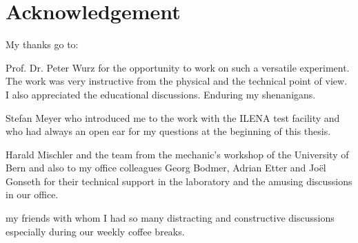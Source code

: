 \documentclass[a4paper, 12pt, abstracton]{scrartcl}
\begin{document}

	
	\newpage
	\thispagestyle{empty}
	\null
	\newpage
	
	\newpage
	
	\clearpage
	\newpage
	\thispagestyle{empty}
	\null
	\newpage
	\clearpage
	
	\newpage
	\thispagestyle{empty}
	\null
	\newpage
	
	\clearpage
	
	\clearpage
	
	\clearpage
	
	\section*{Acknowledgement} %
	
	My thanks go to:
	
	Prof. Dr. Peter Wurz for the opportunity to work on such a versatile experiment. The work was very instructive from the physical and the technical point of view. I also appreciated the educational discussions.
	Enduring my shenanigans.
	
	Stefan Meyer who introduced me to the work with the ILENA test facility and who had always an open ear for my questions at the beginning of this thesis.
		
	Harald Mischler and the team from the mechanic's workshop of the University of Bern and also to my office colleagues Georg Bodmer, Adrian Etter and Joël Gonseth for their technical support in the laboratory and the amusing discussions in our office.
	
	my friends with whom I had so many distracting and constructive discussions especially during our weekly coffee breaks.
	
	\newpage
	\thispagestyle{empty}
	\null
	\newpage
	
	
	
\end{document}
